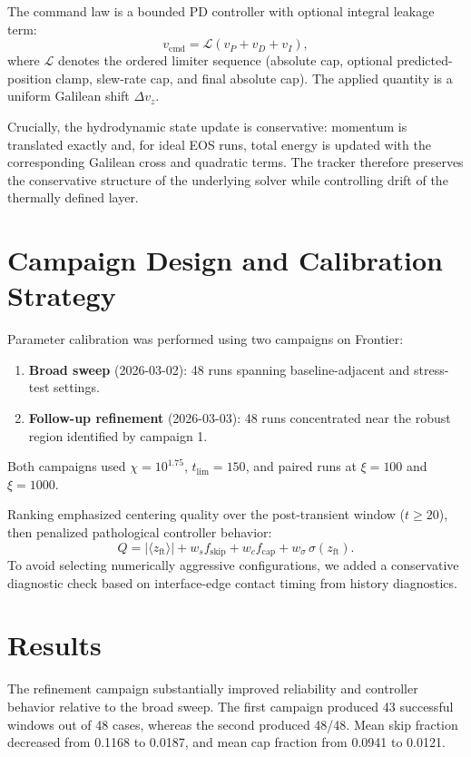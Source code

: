 \documentclass[10pt,twocolumn]{article}
\begin{document}
The command law is a bounded PD controller with optional integral leakage term:
\begin{equation}
v_{\mathrm{cmd}} = \mathcal{L}\!\left(v_P + v_D + v_I\right),
\end{equation}
where $\mathcal{L}$ denotes the ordered limiter sequence (absolute cap, optional predicted-position clamp, slew-rate cap, and final absolute cap). The applied quantity is a uniform Galilean shift $\Delta v_z$.

Crucially, the hydrodynamic state update is conservative: momentum is translated exactly and, for ideal EOS runs, total energy is updated with the corresponding Galilean cross and quadratic terms. The tracker therefore preserves the conservative structure of the underlying solver while controlling drift of the thermally defined layer.

\section{Campaign Design and Calibration Strategy}
Parameter calibration was performed using two campaigns on Frontier:
\begin{enumerate}
  \item \textbf{Broad sweep} (2026-03-02): 48 runs spanning baseline-adjacent and stress-test settings.
  \item \textbf{Follow-up refinement} (2026-03-03): 48 runs concentrated near the robust region identified by campaign 1.
\end{enumerate}
Both campaigns used $\chi=10^{1.75}$, $t_{\mathrm{lim}}=150$, and paired runs at $\xi=100$ and $\xi=1000$.

Ranking emphasized centering quality over the post-transient window ($t\ge20$), then penalized pathological controller behavior:
\begin{equation}
Q = |\langle z_{\mathrm{ft}}\rangle| + w_s f_{\mathrm{skip}} + w_c f_{\mathrm{cap}} + w_\sigma\,\sigma(z_{\mathrm{ft}}).
\end{equation}
To avoid selecting numerically aggressive configurations, we added a conservative diagnostic check based on interface-edge contact timing from history diagnostics.

\section{Results}
The refinement campaign substantially improved reliability and controller behavior relative to the broad sweep. The first campaign produced 43 successful windows out of 48 cases, whereas the second produced 48/48. Mean skip fraction decreased from 0.1168 to 0.0187, and mean cap fraction from 0.0941 to 0.0121.
\end{document}
